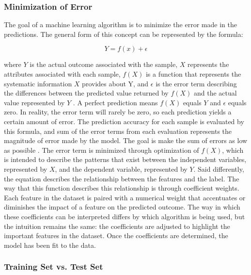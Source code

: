 \documentclass[sigconf]{acmart}
\begin{document}
\subsubsection{Minimization of Error}

The goal of a machine learning algorithm is to minimize the error made in the predictions. The general form of this concept can be represented by the formula:

\[Y = f(x) + \epsilon\]

where \(Y\) is the actual outcome associated with the sample, \(X\) represents the attributes associated with each sample, \(f(X)\) is a function that represents the systematic information \(X\) provides about Y, and \(\epsilon\) is the error term describing the differences between the predicted value returned by \(f(X)\) and the actual value represented by \(Y\) \cite{cite03}. A perfect prediction means \(f(X)\) equals \(Y\) and \(\epsilon\) equals zero. In reality, the error term will rarely be zero, so each prediction yields a certain amount of error. The prediction accuracy for each sample is evaluated by this formula, and sum of the error terms from each evaluation represents the magnitude of error made by the model. The goal is make the sum of errors as low as possible \cite{cite03}.
The error term is minimized through optimization of \(f(X)\), which is intended to describe the patterns that exist between the independent variables, represented by \(X\), and the dependent variable, represented by \(Y\). Said differently, the equation describes the relationship between the features and the label. The way that this function describes this relationship is through coefficient weights. Each feature in the dataset is paired with a numerical weight that accentuates or diminishes the impact of a feature on the predicted outcome. The way in which these coefficients can be interpreted differs by which algorithm is being used, but the intuition remains the same: the coefficients are adjusted to highlight the important features in the dataset. Once the coefficients are determined, the model has been fit to the data.

\subsubsection{Training Set vs. Test Set}
\end{document}
